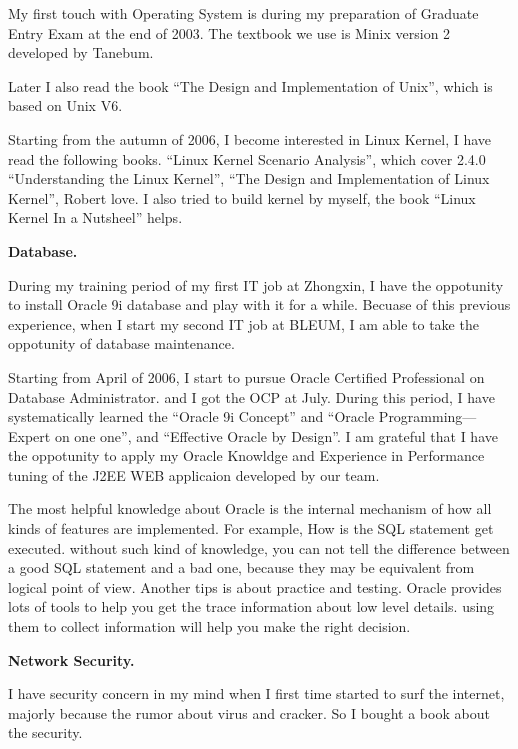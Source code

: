 My first touch with Operating System is during my preparation of Graduate Entry
Exam at the end of 2003. The textbook we use is Minix version 2 developed by 
Tanebum.%

Later I also read the book ``The Design and Implementation of Unix'', which is
 based on Unix V6.

Starting from the autumn of 2006, I become interested in Linux Kernel, I have
read the following books.
 ``Linux Kernel Scenario Analysis'', which cover 2.4.0
 ``Understanding the Linux Kernel'',
 ``The Design and Implementation of Linux Kernel'', Robert love.
I also tried to build kernel by myself, the book ``Linux Kernel In a Nutsheel''
helps.



\medskip\noindent
{\bf Database.}

During my training period of my first IT job at Zhongxin, I have the oppotunity 
to install 
Oracle 9i database and play with it for a while. Becuase of this previous 
experience, when I start my second IT job
at BLEUM, I am able to take the oppotunity of database maintenance.

Starting from April of 2006, I start to pursue Oracle Certified Professional on 
Database Administrator. and I got the OCP at July. During this period, I have 
systematically learned the ``Oracle 9i Concept'' and ``Oracle Programming---%
Expert on one one'', and ``Effective Oracle by Design''. I am grateful that I 
have the oppotunity to apply my Oracle Knowldge and Experience in Performance
tuning of the J2EE WEB applicaion developed by our team.

The most helpful knowledge about Oracle is the internal mechanism of how all 
kinds of features are implemented. For example, How is the SQL statement get
executed. without such kind of knowledge, you can not tell the difference
 between a good SQL statement and a bad one, because they may be equivalent 
 from logical point of view.
 Another tips is about practice and testing. Oracle provides lots of tools to 
 help you get the trace information about low level details. using them to 
 collect information will help you make the right decision.
 
  

\medskip\noindent
{\bf Network Security.}

I have security concern in my mind when I first time started to surf the 
internet, majorly because the rumor about virus and cracker. So I bought a book
about the security.

